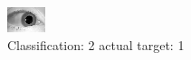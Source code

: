 \begin{figure}[h!]
\begin{center}
\includegraphics[width=0.60\columnwidth]{figures/ID1420_class_2_target_1.png}
\end{center}
\caption{ Classification: 2 actual target: 1}
\label{fig:ID1420_class_2_target_1}
\end{figure}
